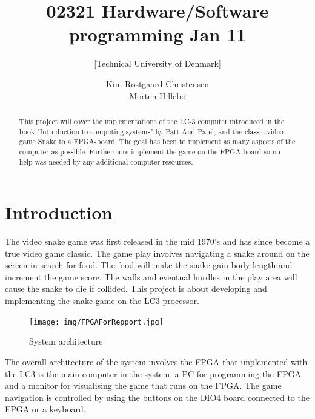 \documentclass{acm_proc_article-sp}
\begin{document}
\title{02321 Hardware/Software programming Jan 11}
\subtitle{[Technical University of Denmark]
}

\author{
\alignauthor 
Kim Rostgaard Christensen\\
\alignauthor 
Morten Hillebo
}




\begin{abstract}
This project will cover the implementations of the LC-3 computer introduced in the book "Introduction to computing systems"\cite{patt2000introduction} by Patt And Patel, and the classic video game Snake to a FPGA-board. 
The goal has been to implement as many aspects of the computer as possible. 
Furthermore implement the game on the FPGA-board so no help was needed by any additional computer resources.
\end{abstract}

\section{Introduction}
\label{sec:introduction}

The video snake game was first released in the mid 1970's and has since become a true video game classic. 
The game play involves navigating a snake around on the screen in search for food. 
The food will make the snake gain body length and increment the game score. 
The walls and eventual hurdles in the play area will cause the snake to die if collided.
This project is about developing and implementing the snake game on the LC3 processor. 

\begin{figure}[h]
\centering
\texttt{[image: img/FPGAForRepport.jpg]} 
\caption{System architecture}
\label{fig:architecture}
\end{figure}

The overall architecture of the system involves the FPGA that implemented with the LC3 is the main computer in the system, a PC for programming the FPGA and a monitor for visualising the game that runs on the FPGA. 
The game navigation is controlled by using the buttons on the DIO4 board connected to the FPGA or a keyboard.
\end{document}
